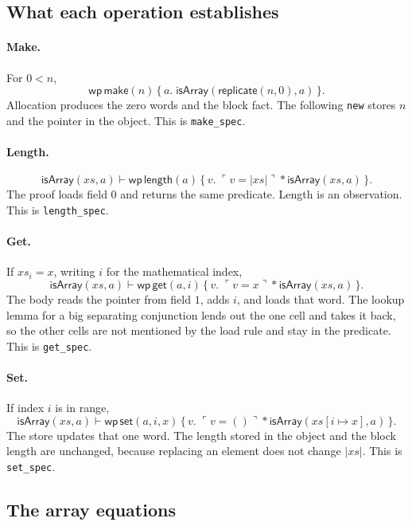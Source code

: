 \documentclass[11pt]{article}
\newcommand{\Unit}{\mathsf{()}}
\newcommand{\sep}{\mathbin{*}}
\newcommand{\Wpre}{\mathsf{wp}}
\newcommand{\pure}[1]{\ulcorner #1 \urcorner}
\begin{document}
\subsection{What each operation establishes}

\paragraph{Make.}
For \(0 < n\),
\[
\Wpre\,\mathsf{make}(n)
\,\{\,a.\; \mathsf{isArray}(\mathsf{replicate}(n, 0), a)\,\}.
\]
Allocation produces the zero words and the block fact.
The following \texttt{new} stores \(n\) and the pointer in the object.
This is \texttt{make\_spec}.

\paragraph{Length.}
\[
\mathsf{isArray}(xs, a)
\vdash
\Wpre\,\mathsf{length}(a)
\,\{\,v.\; \pure{v = \lvert xs \rvert} \sep \mathsf{isArray}(xs, a)\,\}.
\]
The proof loads field \(0\) and returns the same predicate.
Length is an observation.
This is \texttt{length\_spec}.

\paragraph{Get.}
If \(xs_i = x\), writing \(i\) for the mathematical index,
\[
\mathsf{isArray}(xs, a)
\vdash
\Wpre\,\mathsf{get}(a, i)
\,\{\,v.\; \pure{v = x} \sep \mathsf{isArray}(xs, a)\,\}.
\]
The body reads the pointer from field \(1\), adds \(i\), and loads that word.
The lookup lemma for a big separating conjunction lends out the one cell and takes it back, so the other cells are not mentioned by the load rule and stay in the predicate.
This is \texttt{get\_spec}.

\paragraph{Set.}
If index \(i\) is in range,
\[
\mathsf{isArray}(xs, a)
\vdash
\Wpre\,\mathsf{set}(a, i, x)
\,\{\,v.\; \pure{v = \Unit} \sep \mathsf{isArray}(xs[i \mapsto x], a)\,\}.
\]
The store updates that one word.
The length stored in the object and the block length are unchanged, because replacing an element does not change \(\lvert xs \rvert\).
This is \texttt{set\_spec}.

\subsection{The array equations}
\end{document}
